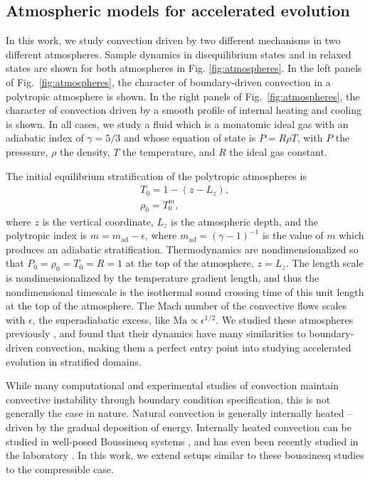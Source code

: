 \subsection{Atmospheric models for accelerated evolution}
\label{sec:atmospheres}
In this work, we study convection driven by two different mechanisms in two different atmospheres.
Sample dynamics in disequilibrium states and in relaxed states are shown for both atmospheres in Fig. \ref{fig:atmospheres}.
In the left panels of Fig.~\ref{fig:atmospheres}, the character of boundary-driven convection in a polytropic atmosphere is shown.
In the right panels of Fig.~\ref{fig:atmospheres}, the character of convection driven by a smooth profile of internal heating and cooling is shown.
In all cases, we study a fluid which is a monatomic ideal gas with an adiabatic index of $\gamma = 5/3$ and whose equation of state is $P = R \rho T$, with $P$ the presssure, $\rho$ the density, $T$ the temperature, and $R$ the ideal gas constant.

The initial equilibrium stratification of the polytropic atmospheres is
\begin{equation}
\begin{split}
T_0 = 1 - (z - L_z), \\
\rho_0 = T_0^{m},
\end{split}
\end{equation}
where $z$ is the vertical coordinate, $L_z$ is the atmospheric depth, and the polytropic index is $m = m_{\text{ad}} - \epsilon$, where $m_{\text{ad}} = (\gamma-1)^{-1}$ is the value of $m$ which produces an adiabatic stratification.
Thermodynamics are nondimensionalized so that $P_0 = \rho_0 = T_0 = R = 1$ at the top of the atmosphere, $z = L_z$.
The length scale is nondimensionalized by the temperature gradient length, and thus the nondimensional timescale is the isothermal sound crossing time of this unit length at the top of the atmosphere.
The Mach number of the convective flows scales with $\epsilon$, the superadiabatic excess, like $\text{Ma} \propto \epsilon^{1/2}$.
We studied these atmospheres previously \cite{anders&brown2017}, and found that their dynamics have many similarities to boundary-driven \RB convection, making them a perfect entry point into studying accelerated evolution in stratified domains.

While many computational and experimental studies of convection maintain convective instability through boundary condition specification, this is not generally the case in nature.
Natural convection is generally internally heated -- driven by the gradual deposition of energy.
Internally heated convection can be studied in well-posed Boussinesq systems \cite{goluskin&spiegel2012, goluskin&all2016}, and has even been recently studied in the laboratory \cite{lepot&all2018, bouillaut&all2019}.
In this work, we extend setups similar to these boussinesq studies to the compressible case.

